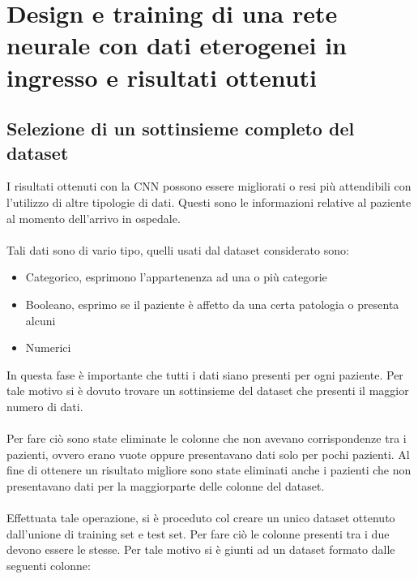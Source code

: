 \chapter{Design e training di una rete neurale con dati eterogenei in ingresso e risultati ottenuti}
\label{ch:MLP}
\section{Selezione di un sottinsieme completo del dataset}
I risultati ottenuti con la CNN possono essere migliorati o resi più attendibili con l'utilizzo
di altre tipologie di dati. Questi sono le informazioni relative al paziente al momento dell'arrivo in 
ospedale.
\\\\
Tali dati sono di vario tipo, quelli usati dal dataset considerato sono: 
\begin{itemize}
    \item Categorico, esprimono l'appartenenza ad una o più categorie
    \item Booleano, esprimo se il paziente è affetto da una certa patologia o presenta alcuni 
    \item Numerici
\end{itemize}
In questa fase è importante che tutti i dati siano presenti per ogni paziente. Per tale motivo si è dovuto 
trovare un sottinsieme del dataset che presenti il maggior numero di dati. 
\\\\
Per fare ciò sono state eliminate le colonne che non avevano corrispondenze 
tra i pazienti, ovvero erano vuote oppure presentavano dati solo per pochi pazienti.
Al fine di ottenere un risultato migliore sono state eliminati anche i pazienti che non presentavano dati per 
la maggiorparte delle colonne del dataset.
\\\\
Effettuata tale operazione, si è proceduto col creare un unico dataset ottenuto dall'unione 
di training set e test set. Per fare ciò le colonne presenti tra i due devono essere le stesse.
Per tale motivo si è giunti ad un dataset formato dalle seguenti colonne:
